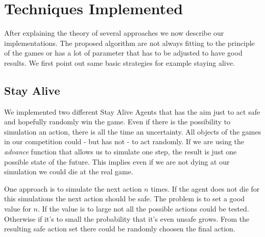 \section{Techniques Implemented} 
\label{sec:exp}

After explaining the theory of several approaches we now describe our implementations. The proposed algorithm are not always fitting to 
the principle of the games or has a lot of parameter that has to be adjusted to have good results. We first point out same basic strategies
for example staying alive.


\subsection{Stay Alive} 

We implemented two different Stay Alive Agents that has the aim just to act safe and hopefully randomly win the game.
Even if there is the possibility to simulation an action, there is all the time an uncertainty. All objects of the games in our competition
could - but has not - to act randomly. If we are using the \textit{advance} function that allows us to simulate one step, the result is just one possible state of the future. This implies even if we are not dying at our simulation we could die at the real game.

One approach is to simulate the next action $n$ times. If the agent does not die for this simulations the next action should be safe.
The problem is to set a good value for $n$. If the value is to large not all the possible actions could be tested. Otherwise 
if it's to small the probability that it's even unsafe grows.
From the resulting safe action set there could be randomly choosen the final action.

